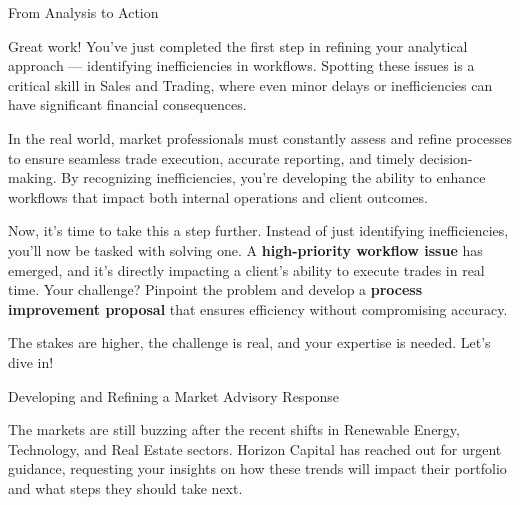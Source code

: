 \documentclass[11pt]{article}
\begin{document}

\newpage
{\fontsize{26}{30}\selectfont From Analysis to Action}\par\bigskip

Great work! You've just completed the first step in refining your analytical
approach --- identifying inefficiencies in workflows. Spotting these issues is
a critical skill in Sales and Trading, where even minor delays or
inefficiencies can have significant financial consequences.

In the real world, market professionals must constantly assess and refine
processes to ensure seamless trade execution, accurate reporting, and timely
decision-making. By recognizing inefficiencies, you're developing the ability
to enhance workflows that impact both internal operations and client outcomes.

Now, it's time to take this a step further. Instead of just identifying
inefficiencies, you'll now be tasked with solving one. A
\textbf{high-priority workflow issue} has emerged, and it's directly impacting
a client's ability to execute trades in real time. Your challenge? Pinpoint
the problem and develop a \textbf{process improvement proposal} that ensures
efficiency without compromising accuracy.


The stakes are higher, the challenge is real, and your expertise is needed.
Let's dive in!

\newpage
{\fontsize{26}{30}\selectfont Developing and Refining a Market Advisory Response}\par\bigskip

The markets are still buzzing after the recent shifts in Renewable Energy,
Technology, and Real Estate sectors. Horizon Capital has reached out for urgent
guidance, requesting your insights on how these trends will impact their
portfolio and what steps they should take next.
\end{document}
